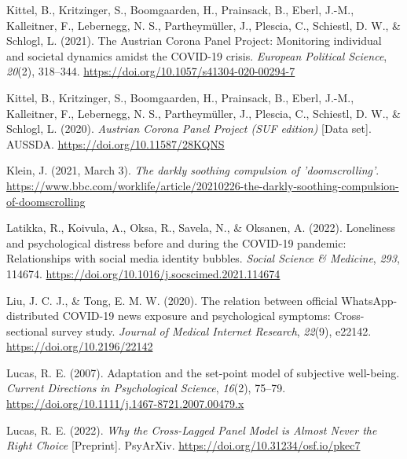 \documentclass[
  man,floatsintext]{apa7}
\newlength{\cslhangindent}
\newlength{\cslentryspacingunit} %
\newenvironment{CSLReferences}[2] %
 {%
  \setlength{\parindent}{0pt}
  \ifodd #1
  \let\oldpar\par
  \def\par{\hangindent=\cslhangindent\oldpar}
  \fi
  \setlength{\parskip}{#2\cslentryspacingunit}
 }%
 {}
\begin{document}
\begin{CSLReferences}{1}{0}
\leavevmode{}%
Kittel, B., Kritzinger, S., Boomgaarden, H., Prainsack, B., Eberl, J.-M., Kalleitner, F., Lebernegg, N. S., Partheymüller, J., Plescia, C., Schiestl, D. W., \& Schlogl, L. (2021). The {Austrian Corona Panel Project}: Monitoring individual and societal dynamics amidst the {COVID-19} crisis. \emph{European Political Science}, \emph{20}(2), 318--344. \url{https://doi.org/10.1057/s41304-020-00294-7}

\leavevmode{}%
Kittel, B., Kritzinger, S., Boomgaarden, H., Prainsack, B., Eberl, J.-M., Kalleitner, F., Lebernegg, N. S., Partheymüller, J., Plescia, C., Schiestl, D. W., \& Schlogl, L. (2020). \emph{Austrian {Corona Panel Project} ({SUF} edition)} {[}Data set{]}. {AUSSDA}. \url{https://doi.org/10.11587/28KQNS}

\leavevmode{}%
Klein, J. (2021, March 3). \emph{The darkly soothing compulsion of 'doomscrolling'}. \url{https://www.bbc.com/worklife/article/20210226-the-darkly-soothing-compulsion-of-doomscrolling}

\leavevmode{}%
Latikka, R., Koivula, A., Oksa, R., Savela, N., \& Oksanen, A. (2022). Loneliness and psychological distress before and during the {COVID-19} pandemic: {Relationships} with social media identity bubbles. \emph{Social Science \& Medicine}, \emph{293}, 114674. \url{https://doi.org/10.1016/j.socscimed.2021.114674}

\leavevmode{}%
Liu, J. C. J., \& Tong, E. M. W. (2020). The relation between official {WhatsApp-distributed COVID-19} news exposure and psychological symptoms: Cross-sectional survey study. \emph{Journal of Medical Internet Research}, \emph{22}(9), e22142. \url{https://doi.org/10.2196/22142}

\leavevmode{}%
Lucas, R. E. (2007). Adaptation and the set-point model of subjective well-being. \emph{Current Directions in Psychological Science}, \emph{16}(2), 75--79. \url{https://doi.org/10.1111/j.1467-8721.2007.00479.x}

\leavevmode{}%
Lucas, R. E. (2022). \emph{Why the {Cross-Lagged Panel Model} is {Almost Never} the {Right Choice}} {[}Preprint{]}. {PsyArXiv}. \url{https://doi.org/10.31234/osf.io/pkec7}


\end{CSLReferences}
\end{document}
